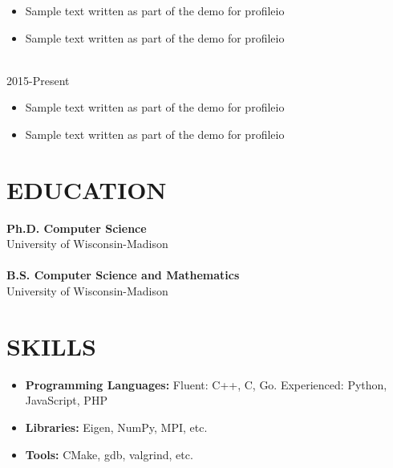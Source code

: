 \documentclass{res}
\begin{document}
\begin{resume}
\begin{itemize}[leftmargin=\parindent]
	\item Sample text written as part of the demo for profileio
	\item Sample text written as part of the demo for profileio
	\end{itemize}
	
	\hspace*{-0.25in}{\bf Project V} \\
	\hspace*{-0.25in} \hfill 2015-Present
	\begin{itemize}[leftmargin=\parindent]
	\setlength{\itemsep}{0mm} \smallskip
	
	\item Sample text written as part of the demo for profileio
	\item Sample text written as part of the demo for profileio
	\end{itemize}
	
	
	
	\section{\MakeUppercase{Education}} \vskip 0.15in
	
	{\bf Ph.D. Computer Science} \hfill  \\
	{University of Wisconsin-Madison \hfill } \\ \\
	{\bf B.S. Computer Science and Mathematics} \hfill  \\
	{University of Wisconsin-Madison \hfill } 
	
	
	
	\section{\MakeUppercase{Skills}} \vskip 0.35in
	\begin{itemize}[leftmargin=\parindent]
	\setlength{\itemsep}{6pt}
	
		\item[] {\bf Programming Languages:} Fluent: C++, C, Go. Experienced: Python, JavaScript, PHP
		\item[] {\bf Libraries:} Eigen, NumPy, MPI, etc.
		\item[] {\bf Tools:} CMake, gdb, valgrind, etc.
	\end{itemize}
	

\end{resume}
\end{document}
